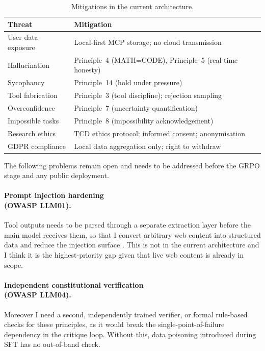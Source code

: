 \documentclass[11pt,a4paper]{article}
\begin{document}
\begin{table}[h]
\centering
\caption{Mitigations in the current architecture.}
\label{tab:mitigations}
\small
\renewcommand{\arraystretch}{1.1}
\begin{tabular}{@{}p{2.2cm}p{4.5cm}@{}}
\toprule
\textbf{Threat} & \textbf{Mitigation} \\
\midrule
User data exposure & Local-first MCP storage; no cloud transmission \\
Hallucination & Principle~4 (MATH=CODE), Principle~5 (real-time honesty) \\
Sycophancy & Principle~14 (hold under pressure) \\
Tool fabrication & Principle~3 (tool discipline); rejection sampling \\
Overconfidence & Principle~7 (uncertainty quantification) \\
Impossible tasks & Principle~8 (impossibility acknowledgement) \\
Research ethics & TCD ethics protocol; informed consent; anonymisation \\
GDPR compliance & Local data aggregation only; right to withdraw \\
\bottomrule
\end{tabular}
\end{table}

The following problems remain open and needs to be addressed before the GRPO stage and any public deployment.

\paragraph{Prompt injection hardening \\(OWASP LLM01).} Tool outputs needs to be parsed through a separate extraction layer before the main model receives them, so that I convert arbitrary web content into structured data and reduce the injection surface \cite{logtoleak}. This is not in the current architecture and I think it is the highest-priority gap given that live web content is already in scope.

\paragraph{Independent constitutional verification \\(OWASP LLM04).} Moreover I need a second, independently trained verifier, or formal rule-based checks for these principles, as it would break the single-point-of-failure dependency in the critique loop. Without this, data poisoning introduced during SFT has no out-of-band check.
\end{document}
